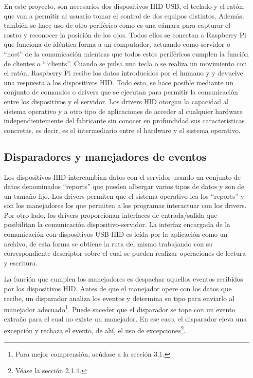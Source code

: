 En este proyecto, son necesarios dos dispositivos HID USB, el teclado y el ratón, que van a permitir al usuario tomar el control de dos equipos distintos. Además, también se hace uso de otro periférico como es una cámara para capturar el rostro y reconocer la posición de los ojos. Todos ellos se conectan a Raspberry Pi que funciona de idéntica forma a un computador, actuando como servidor o ``host'' de la comunicación mientras que todos estos periféricos cumplen la función de clientes o ```clients''. Cuando se pulsa una tecla o se realiza un movimiento con el ratón, Raspberry Pi recibe los datos introducidos por el humano y y devuelve una respuesta a los dispositivos HID. Todo esto, se hace posible mediante un conjunto de comandos o drivers que se ejecutan para permitir la comunicación entre los dispositivos y el servidor. Los drivers HID otorgan la capacidad al sistema operativo y a otro tipo de aplicaciones de acceder al cualquier hardware independientemente del fabricante sin conocer en profundidad sus características concretas, es decir, es el intermediario entre el hardware y el sistema operativo.



\subsection{Disparadores y manejadores de eventos} \label{s2_1_2}

Los dispositivos HID intercambian datos con el servidor usando un conjunto de datos denominados ``reports'' que pueden albergar varios tipos de datos y son de un tamaño fijo. Los drivers permiten que el sistema operativo lea los ``reports'' y son los manejadores los que permiten a los programas interactuar con los drivers. Por otro lado, los drivers proporcionan interfaces de entrada/salida que posibilitan la comunicación dispositivo-servidor. La interfaz encargada de la comunicación con dispositivos USB HID es leída por la aplicación como un archivo, de esta forma se obtiene la ruta del mismo trabajando con su correspondiente descriptor sobre el cual se pueden realizar operaciones de lectura y escritura. 

La función que cumplen los manejadores es despachar aquellos eventos recibidos por los dispositivos HID. Antes de que el manejador opere con los datos que recibe, un disparador analiza los eventos y determina su tipo para enviarlo al manejador adecuado\footnote{Para mejor comprensión, acúdase a la sección 3.1.}. Puede suceder que el disparador se tope con un evento extraño para el cual no existe un manejador. En ese caso, el disparador eleva una excepción y rechaza el evento, de ahí, el uso de excepciones\footnote{Véase la sección 2.1.4.}.

